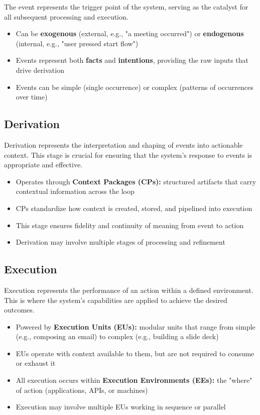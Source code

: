 \documentclass[12pt,a4paper]{article}
\begin{document}
The event represents the trigger point of the system, serving as the catalyst for all subsequent processing and execution.

\begin{itemize}
\item Can be \textbf{exogenous} (external, e.g., "a meeting occurred") or \textbf{endogenous} (internal, e.g., "user pressed start flow")
\item Events represent both \textbf{facts} and \textbf{intentions}, providing the raw inputs that drive derivation
\item Events can be simple (single occurrence) or complex (patterns of occurrences over time)
\end{itemize}

\subsection{Derivation}

Derivation represents the interpretation and shaping of events into actionable context. This stage is crucial for ensuring that the system's response to events is appropriate and effective.

\begin{itemize}
\item Operates through \textbf{Context Packages (CPs):} structured artifacts that carry contextual information across the loop
\item CPs standardize how context is created, stored, and pipelined into execution
\item This stage ensures fidelity and continuity of meaning from event to action
\item Derivation may involve multiple stages of processing and refinement
\end{itemize}

\subsection{Execution}

Execution represents the performance of an action within a defined environment. This is where the system's capabilities are applied to achieve the desired outcomes.

\begin{itemize}
\item Powered by \textbf{Execution Units (EUs):} modular units that range from simple (e.g., composing an email) to complex (e.g., building a slide deck)
\item EUs operate with context available to them, but are not required to consume or exhaust it
\item All execution occurs within \textbf{Execution Environments (EEs):} the "where" of action (applications, APIs, or machines)
\item Execution may involve multiple EUs working in sequence or parallel
\end{itemize}
\end{document}
